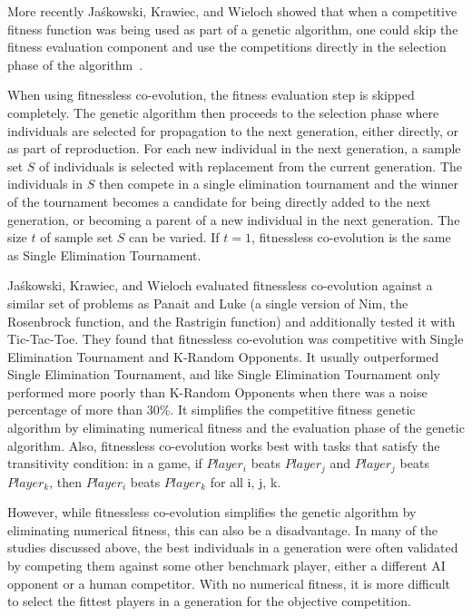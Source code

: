 More recently Ja\'{s}kowski, Krawiec, and Wieloch showed that when a competitive
fitness function was being used as part of a genetic algorithm, one could skip
the fitness evaluation component and use the competitions directly in the
selection phase of the algorithm~\cite{Jaskowski:2008:FC:1389095.1389161}.

When using fitnessless co-evolution, the fitness evaluation step is skipped
completely. The genetic algorithm then proceeds to the selection phase where
individuals are selected for propagation to the next generation, either
directly, or as part of reproduction. For each new individual in the next
generation, a sample set \(S\) of individuals is selected with replacement from
the current generation. The individuals in \(S\) then compete in a single
elimination tournament and the winner of the tournament becomes a candidate for
being directly added to the next generation, or becoming a parent of a new
individual in the next generation. The size \(t\) of sample set \(S\) can be
varied. If \(t=1\), fitnessless co-evolution is the same as Single Elimination
Tournament.

Ja\'{s}kowski, Krawiec, and Wieloch evaluated fitnessless co-evolution against a
similar set of problems as Panait and Luke (a single version of Nim, the
Rosenbrock function, and the Rastrigin function) and additionally tested it with
Tic-Tac-Toe. They found that fitnessless co-evolution was competitive with
Single Elimination Tournament and K-Random Opponents. It usually outperformed
Single Elimination Tournament, and like Single Elimination Tournament only
performed more poorly than K-Random Opponents when there was a noise percentage
of more than 30\%. It simplifies the competitive fitness genetic algorithm by
eliminating numerical fitness and the evaluation phase of the genetic algorithm.
Also, fitnessless co-evolution works best with tasks that satisfy the
transitivity condition: in a game, if \(Player_{i}\) beats \(Player_{j}\) and
\(Player_{j}\) beats \(Player_{k}\), then \(Player_{i}\) beats \(Player_{k}\)
for all i, j, k.

However, while fitnessless co-evolution simplifies the genetic algorithm by
eliminating numerical fitness, this can also be a disadvantage. In many of the
studies discussed above, the best individuals in a generation were often
validated by competing them against some other benchmark player, either a
different AI opponent or a human competitor. With no numerical fitness, it is
more difficult to select the fittest players in a generation for the objective
competition.

